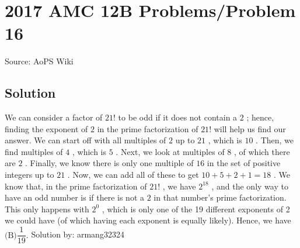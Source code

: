 \documentclass[12pt]{article}
\begin{document}
\section*{{2017 AMC 12B Problems/Problem 16}}
Source: AoPS Wiki

\subsection*{Solution}
We can consider a factor of $21!$ to be odd if it does not contain a $2$ ; hence, finding the exponent of $2$ in the prime factorization of $21!$ will help us find our answer. We can start off with all multiples of $2$ up to $21$ , which is $10$ . Then, we find multiples of $4$ , which is $5$ . Next, we look at multiples of $8$ , of which there are $2$ . Finally, we know there is only one multiple of $16$ in the set of positive integers up to $21$ . Now, we can add all of these to get $10+5+2+1=18$ . We know that, in the prime factorization of $21!$ , we have $2^{18}$ , and the only way to have an odd number is if there is not a $2$ in that number's prime factorization. This only happens with $2^{0}$ , which is only one of the 19 different exponents of 2 we could have (of which having each exponent is equally likely). Hence, we have $\boxed{\text{(B)} \dfrac{1}{19}}.$ Solution by: armang32324
\end{document}
